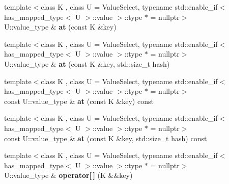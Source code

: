 \begin{DoxyCompactItemize}
{\footnotesize template$<$class K , class U  = Value\+Select, typename std\+::enable\+\_\+if$<$ has\+\_\+mapped\+\_\+type$<$ U $>$\+::value $>$\+::type $\ast$  = nullptr$>$ }\\U\+::value\+\_\+type \& {\bfseries at} (const K \&key)
\item 
\mbox{\label{classtsl_1_1detail__robin__hash_1_1robin__hash_aec542fcdfb63b6a77cc1b62a4f7d6d93}} 
{\footnotesize template$<$class K , class U  = Value\+Select, typename std\+::enable\+\_\+if$<$ has\+\_\+mapped\+\_\+type$<$ U $>$\+::value $>$\+::type $\ast$  = nullptr$>$ }\\U\+::value\+\_\+type \& {\bfseries at} (const K \&key, std\+::size\+\_\+t hash)
\item 
\mbox{\label{classtsl_1_1detail__robin__hash_1_1robin__hash_a5c8725ed605e3ec7ed4b14532af4bba0}} 
{\footnotesize template$<$class K , class U  = Value\+Select, typename std\+::enable\+\_\+if$<$ has\+\_\+mapped\+\_\+type$<$ U $>$\+::value $>$\+::type $\ast$  = nullptr$>$ }\\const U\+::value\+\_\+type \& {\bfseries at} (const K \&key) const
\item 
\mbox{\label{classtsl_1_1detail__robin__hash_1_1robin__hash_a3c5e1823606e6245f6d7562c8ca4ba62}} 
{\footnotesize template$<$class K , class U  = Value\+Select, typename std\+::enable\+\_\+if$<$ has\+\_\+mapped\+\_\+type$<$ U $>$\+::value $>$\+::type $\ast$  = nullptr$>$ }\\const U\+::value\+\_\+type \& {\bfseries at} (const K \&key, std\+::size\+\_\+t hash) const
\item 
\mbox{\label{classtsl_1_1detail__robin__hash_1_1robin__hash_a8ccbd7862f50c262daef12d45c238c57}} 
{\footnotesize template$<$class K , class U  = Value\+Select, typename std\+::enable\+\_\+if$<$ has\+\_\+mapped\+\_\+type$<$ U $>$\+::value $>$\+::type $\ast$  = nullptr$>$ }\\U\+::value\+\_\+type \& {\bfseries operator\mbox{[}$\,$\mbox{]}} (K \&\&key)
\item 
\mbox{\label{classtsl_1_1detail__robin__hash_1_1robin__hash_a915500ff4656b6b8719a15d31f7ab56b}} 

\end{DoxyCompactItemize}
